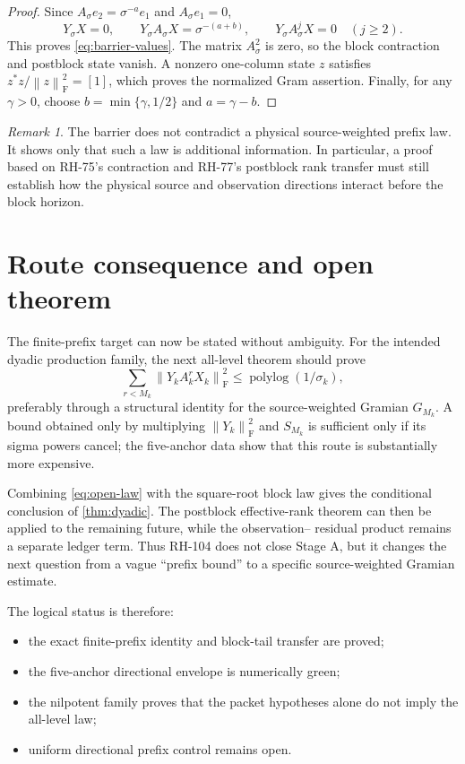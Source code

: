\documentclass[11pt]{article}
\theoremstyle{definition}
\theoremstyle{remark}
\newtheorem{remark}[theorem]{Remark}
\newcommand{\norm}[1]{\left\lVert#1\right\rVert}
\newcommand{\F}{\mathrm F}
\begin{document}
\begin{proof}
 Since $A_\sigma e_2=\sigma^{-a}e_1$ and $A_\sigma e_1=0$,
 \[
 Y_\sigma X=0,\qquad
 Y_\sigma A_\sigma X=\sigma^{-(a+b)},\qquad
 Y_\sigma A_\sigma^jX=0\quad(j\ge2).
 \]
 This proves \eqref{eq:barrier-values}.  The matrix $A_\sigma^2$ is zero,
 so the block contraction and postblock state vanish.  A nonzero one-column
 state $z$ satisfies $z^*z/\norm z_{\F}^2=[1]$, which proves the normalized
 Gram assertion.  Finally, for any $\gamma>0$, choose
 $b=\min\{\gamma,1/2\}$ and $a=\gamma-b$.
\end{proof}

\begin{remark}
 The barrier does not contradict a physical source-weighted prefix law.  It
 shows only that such a law is additional information.  In particular, a
 proof based on RH-75's contraction and RH-77's postblock rank transfer must
 still establish how the physical source and observation directions interact
 before the block horizon.
\end{remark}

\section{Route consequence and open theorem}
\label{sec:route}

The finite-prefix target can now be stated without ambiguity.  For the
intended dyadic production family, the next all-level theorem should prove
\begin{equation}
 \sum_{r<M_k}\norm{Y_kA_k^rX_k}_{\F}^2
 \le \operatorname{polylog}(1/\sigma_k),
 \label{eq:open-law}
\end{equation}
preferably through a structural identity for the source-weighted Gramian
$G_{M_k}$.  A bound obtained only by multiplying
$\norm{Y_k}_{\F}^2$ and $S_{M_k}$ is sufficient only if its sigma powers
cancel; the five-anchor data show that this route is substantially more
expensive.

Combining \eqref{eq:open-law} with the square-root block law gives the
conditional conclusion of \cref{thm:dyadic}.  The postblock effective-rank
theorem can then be applied to the remaining future, while the observation--
residual product remains a separate ledger term.  Thus RH-104 does not close
Stage A, but it changes the next question from a vague ``prefix bound'' to a
specific source-weighted Gramian estimate.

The logical status is therefore:
\begin{itemize}[leftmargin=2.2em]
 \item the exact finite-prefix identity and block-tail transfer are proved;
 \item the five-anchor directional envelope is numerically green;
 \item the nilpotent family proves that the packet hypotheses alone do not
       imply the all-level law;
 \item uniform directional prefix control remains open.
\end{itemize}
\end{document}
